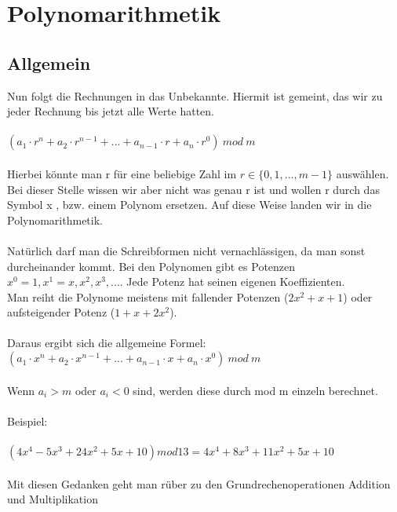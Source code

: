 \section{Polynomarithmetik}

\subsection{Allgemein}
Nun folgt die Rechnungen in das Unbekannte. Hiermit ist gemeint, das wir zu jeder Rechnung bis jetzt alle Werte hatten.\\
\\
$
( a_1 \cdot r^n + a_2 \cdot r^{n-1} + ... + a_{n-1} \cdot r + a_n \cdot r^0)\ mod\ m
$
\\
\\
Hierbei könnte man r für eine beliebige Zahl im $ r \in \{0,1,..., m-1\} $ auswählen. Bei dieser Stelle wissen wir aber nicht was genau r ist
und wollen r durch das Symbol x , bzw. einem Polynom ersetzen. Auf diese Weise landen wir in die Polynomarithmetik.\\
\\
Natürlich darf man die Schreibformen nicht vernachlässigen, da man sonst durcheinander kommt.
Bei den Polynomen gibt es Potenzen $ x^0=1, x^1 = x, x^2, x^3,... $. Jede Potenz hat seinen eigenen Koeffizienten.\\
Man reiht die Polynome meistens mit fallender Potenzen ($2x^2 + x +1$) oder aufsteigender Potenz ($1 + x + 2x^2$). \\
\\Daraus ergibt sich die allgemeine Formel:
\\
$
( a_1 \cdot x^n + a_2 \cdot x^{n-1} + ... + a_{n-1} \cdot x + a_n \cdot x^0)\ mod\ m
$
\\\\
Wenn $a_i > m $ oder $ a_i < 0 $ sind, werden diese durch mod m einzeln berechnet.\\
\\Beispiel:\\
\\
$ (4x^4  -5x^3 + 24x^2 + 5x +10) mod 13 = 4x^4 +8 x^3 + 11x^2 + 5x +10$\\\\
Mit diesen Gedanken geht man rüber zu den Grundrechenoperationen Addition und Multiplikation\\
\newpage
